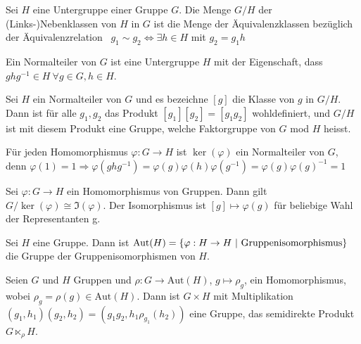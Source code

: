 \begin{definition}[Linksnebenklassen]
    Sei $H$ eine Untergruppe einer Gruppe $G$. Die Menge $G/H$ der
    (Links-)Nebenklassen von $H$ in $G$ ist die Menge der Äquivalenzklassen
    bezüglich der Äquivalenzrelation \
    $g_1 \sim g_2 \Leftrightarrow \exists h \in H$ mit $g_2 = g_1 h$
\end{definition}

\begin{definition}[Normalteiler]
    Ein Normalteiler von $G$ ist eine Untergruppe $H$ mit der Eigenschaft,
    dass $g h g^{-1} \in H \ \forall g \in G, h \in H$.
\end{definition}

\begin{satz}
    Sei $H$ ein Normalteiler von $G$ und es bezeichne $[g]$ die Klasse
    von $g$ in $G/H$. Dann ist für alle $g_1,g_2$ das Produkt
    $[g_1][g_2] = [g_1 g_2]$ wohldefiniert, und $G/H$ ist mit diesem
    Produkt eine Gruppe, welche Faktorgruppe von $G$ mod $H$ heisst.
\end{satz}

\begin{satz}
    Für jeden Homomorphismus $\varphi: G \rightarrow H$ ist $\ker(\varphi)$
    ein Normalteiler von $G$, denn $\varphi(1) = 1 \Rightarrow \varphi(g h g^{-1})
    = \varphi(g) \varphi(h) \varphi(g^{-1}) = \varphi(g) \varphi(g)^{-1} = 1$
\end{satz}

\begin{satz}
    Sei $\varphi: G \rightarrow H$ ein Homomorphismus von Gruppen. Dann gilt
    $G/ \ker(\varphi) \cong \Im(\varphi)$. Der Isomorphismus ist
    $[g] \mapsto \varphi(g)$ für beliebige Wahl der Representanten g.
\end{satz}

\begin{definition}[Automorphismus]
    Sei $H$ eine Gruppe. Dann ist
    $\text{Aut}(H) = \geschwungeneklammer{\varphi: H \rightarrow H \ | \ \text{Gruppenisomorphismus}}$
    die Gruppe der Gruppenisomorphismen von $H$.
\end{definition}

\begin{definition}
    Seien $G$ und $H$ Gruppen und $\rho : G \rightarrow \text{Aut}(H)$,
    $g \mapsto \rho_g$, ein Homomorphismus, wobei $\rho_g = \rho(g) \in
    \text{Aut}(H)$. Dann ist $G \times H$ mit Multiplikation
    $(g_1 , h_1)(g_2 , h_2) = (g_1 g_2 , h_1 \rho_{g_1}(h_2))$ eine Gruppe,
    das semidirekte Produkt $G \ltimes_\rho H$.
\end{definition}

